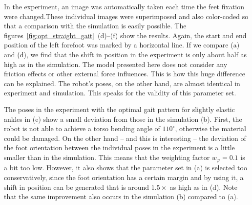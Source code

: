 \documentclass[letterpaper,10pt,conference]{ieeeconf}  %
\begin{document}
%
In the experiment, an image was automatically taken each time the feet fixation were changed.These individual images were superimposed and also color-coded so that a comparison with the simulation is easily possible.
The figures~\ref{fig:opt_straight_gait}~(d)--(f) show the results.
Again, the start and end position of the left forefoot was marked by a horizontal line.
If we compare (a) and (d), we find that the shift in position in the experiment is only about half as high as in the simulation.
The model presented here does not consider any friction effects or other external force influences.
This is how this huge difference can be explained.
The robot's poses, on the other hand, are almost identical in experiment and simulation.
This speaks for the validity of this parameter set.


%
The poses in the experiment with the optimal gait pattern for slightly elastic ankles in (e) show a small deviation from those in the simulation (b).
First, the robot is not able to achieve a torso bending angle of $110^\circ$, otherwise the material could be damaged.
On the other hand -- and this is interesting -- the deviation of the foot orientation between the individual poses in the experiment is a little smaller than in the simulation.
This means that the weighting factor $w_\varphi = 0.1$ is a bit too low.
However, it also shows that the parameter set in (a) is selected too conservatively, since the foot orientation has a certain margin and by using it, a shift in position can be generated that is around $1.5 \times$ as high as in (d).
Note that the same improvement also occurs in the simulation (b) compared to (a).
\end{document}
